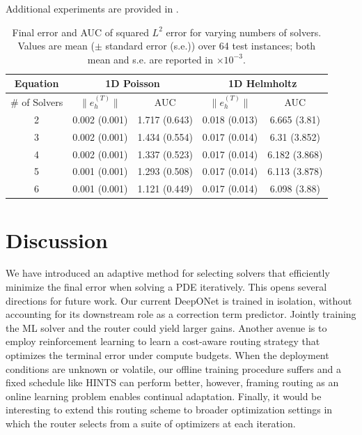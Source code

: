 \documentclass{article} %
\begin{document}
Additional experiments are provided in . 
\begin{table}[]
    \centering
    \begin{tabular}{|c|c|c|c|c|}
        \hline
         Equation & \multicolumn{2}{|c|}{1D Poisson} & \multicolumn{2}{|c|}{1D Helmholtz}\\
         \hline 
        \# of Solvers & $\|e^{(T)}_h\|$ & AUC & $\|e^{(T)}_h\|$ & AUC \\
         \hline
        2 & 0.002 (0.001) & 1.717 (0.643)  & 0.018 (0.013) & 6.665 (3.81)  \\
        3 & 0.002 (0.001) & 1.434 (0.554) & 0.017 (0.014) & 6.31 (3.852)\\
        4 & 0.002 (0.001) & 1.337 (0.523) & 0.017 (0.014) & 6.182 (3.868)  \\
        5 & 0.001 (0.001) & 1.293 (0.508) & 0.017 (0.014) & 6.113 (3.878) \\
        6 & 0.001 (0.001) & 1.121 (0.449) & 0.017 (0.014) & 6.098 (3.88) \\
         \hline
    \end{tabular}

    \caption{Final error and AUC of squared $L^2$ error for varying numbers of solvers. Values are mean ($\pm$ standard error (s.e.)) over 64 test instances; both mean and s.e. are reported in $\times 10^{-3}$.}
    \label{tab:errorcomparison2}
\end{table}
\section{Discussion} \label{sec:discussion}

We have introduced an adaptive method for selecting solvers that efficiently minimize the final error when solving a PDE iteratively. This opens several directions for future work. Our current DeepONet is trained in isolation, without accounting for its downstream role as a correction term predictor. Jointly training the ML solver and the router could yield larger gains. Another avenue is to employ reinforcement learning to learn a cost-aware routing strategy that optimizes the terminal error under compute budgets. 
When the deployment conditions are unknown or volatile, our offline training procedure suffers and a fixed schedule like HINTS can perform better, however, framing routing as an online learning problem enables continual adaptation. Finally, it would be interesting to extend this routing scheme to broader optimization settings in which the router selects from a suite of optimizers at each iteration.
\end{document}
